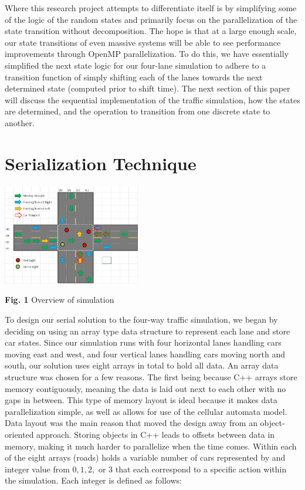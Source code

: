 \documentclass[conference]{IEEEtran}
\begin{document}
Where this research project attempts to differentiate itself is by simplifying some of the logic of the random states and primarily focus on the parallelization of the state transition without decomposition. The hope is that at a large enough scale, our state transitions of even massive systems will be able to see performance improvements through OpenMP parallelization.  To do this, we have essentially simplified the next state logic for our four-lane simulation to adhere to a transition function of simply shifting each of the lanes towards the next determined state (computed prior to shift time).  The next section of this paper will discuss the sequential implementation of the traffic simulation, how the states are determined, and the operation to transition from one discrete state to another. \\

\section{Serialization Technique}

\includegraphics[width=0.45\textwidth]{traffic}
\begin{center}
	\textbf{Fig. 1} Overview of simulation  \\
\end{center}


To design our serial solution to the four-way traffic simulation, we began by deciding on using an array type data structure to represent each lane and store car states. Since our simulation runs with four horizontal lanes handling cars moving east and west, and four vertical lanes handling cars moving north and south, our solution uses eight arrays in total to hold all data. An array data structure was chosen for a few reasons. The first being because C++ arrays store memory contiguously, meaning the data is laid out next to each other with no gaps in between. This type of memory layout is ideal because it makes data parallelization simple, as well as allows for use of the cellular automata model. Data layout was the main reason that moved the design away from an object-oriented approach. Storing objects in C++ leads to offsets between data in memory, making it much harder to parallelize when the time comes. Within each of the eight arrays (roads) holds a variable number of cars represented by and integer value from $0, 1, 2, $ or $3$ that each correspond to a specific action within the simulation. Each integer is defined as follows:\\ 
\end{document}
